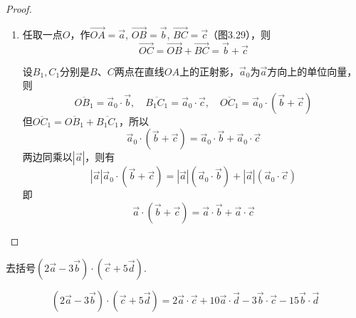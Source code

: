 \begin{proof}
\begin{enumerate}
\begin{figure}[htp]
\begin{minipage}[t]{0.48\textwidth}
\begin{tikzpicture}[>=latex, scale=.8]
    \end{tikzpicture}
    \caption{}
    \end{minipage}
    \end{figure}

\item 任取一点$O$，作$\Vec{OA}=\vec{a}$, $\Vec{OB}=\vec{b}$, $\Vec{BC}=\vec{c}$（图3.29），则
\[\Vec{OC}=\Vec{OB}+\Vec{BC}=\vec{b}+\vec{c}\]

\begin{figure}[htp]
    \centering
{}    
    \caption{}
\end{figure}

设$B_1,C_1$分别是$B$、$C$两点在直线$OA$上的正射影，$\vec{a}_0$为$\vec{a}$方向上的单位向量，则
\[\overline{OB_1}=\vec{a}_0\cdot \vec{b},\quad \overline{B_1C_1}=\vec{a}_0\cdot \vec{c},\quad \overline{OC_1}=\vec{a}_0\cdot \left(\vec{b}+\vec{c}\right)\]
但$\overline{OC_1}=\overline{OB_1}+\overline{B_1C_1}$，所以
\[\vec{a}_0\cdot \left(\vec{b}+\vec{c}\right)=\vec{a}_0\cdot \vec{b}+\vec{a}_0\cdot \vec{c}\]
两边同乘以$|\vec{a}|$，则有
\[|\vec{a}|\vec{a}_0\cdot \left(\vec{b}+\vec{c}\right)=|\vec{a}|\left(\vec{a}_0\cdot \vec{b}\right)+|\vec{a}|\left(\vec{a}_0\cdot \vec{c}\right)\]
即
\[\vec{a}\cdot \left(\vec{b}+\vec{c}\right)=\vec{a}\cdot \vec{b}+\vec{a}\cdot \vec{c}\]
\end{enumerate}
\end{proof}

\begin{example}
    去括号$\left(2\vec{a}-3\vec{b}\right)\cdot \left(\vec{c}+5\vec{d}\right)$.
\end{example}

\begin{solution}
\[\left(2\vec{a}-3\vec{b}\right)\cdot \left(\vec{c}+5\vec{d}\right)=2\vec{a}\cdot \vec{c}+10\vec{a}\cdot \vec{d}-3\vec{b}\cdot \vec{c}-15\vec{b}\cdot \vec{d}\]
\end{solution}


